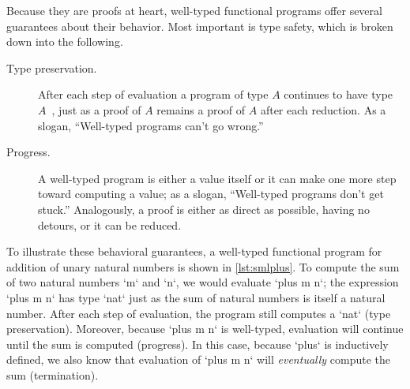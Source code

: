 Because they are proofs at heart, well-typed functional programs offer several guarantees about their behavior.
Most important is type safety, which is broken down into the following.
\begin{description}
\item[Type preservation.]
  After each step of evaluation a program of type $A$ continues to have type~$A$~\autocite{Wright+Felleisen:IC94}, just as a proof of $A$ remains a proof of $A$ after each reduction.
  As a slogan, ``Well-typed programs can't go wrong.''
%
\item[Progress.]
  A well-typed program is either a value itself or it can make one more step toward computing a value; as a slogan, ``Well-typed programs don't get stuck.''
  Analogously, a proof is either as direct as possible, having no detours, or it can be reduced.
%
\end{description}
To illustrate these behavioral guarantees, a well-typed functional program for addition of unary natural numbers is shown in \cref{lst:smlplus}.
To compute the sum of two natural numbers \sml`m` and \sml`n`, we would evaluate \sml`plus m n`; the expression \sml`plus m n` has type \sml`nat` just as the sum of natural numbers is itself a natural number.
After each step of evaluation, the program still computes a \sml`nat` (type preservation).
Moreover, because \sml`plus m n` is well-typed, evaluation will continue until the sum is computed (progress).
In this case, because \sml`plus` is inductively defined, we also know that evaluation of \sml`plus m n` will \emph{eventually} compute the sum (termination).


